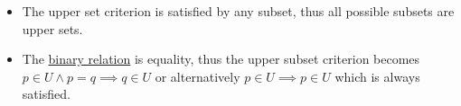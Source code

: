\begin{itemize}
    \item The upper set criterion is satisfied by any subset, thus all possible subsets are upper sets.
    \item The \href{doc/1 math/Seven Sketches in Compositionality/1 Generative Effects/2 What is order/Relation}{binary relation} is equality, thus the upper subset criterion becomes $p \in U \land p = q \implies q \in U$ or alternatively $p \in U \implies p \in U$ which is always satisfied.
  \end{itemize}
